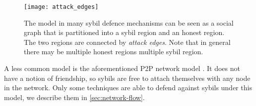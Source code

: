 \begin{figure}
  \centering
  \texttt{[image: attack\_edges]}
  \caption{The model in many sybil defence mechanisms can be seen as a social
    graph that is partitioned into a sybil region and an honest region. The two
    regions are connected by \emph{attack edges}. Note that in general there may
    be multiple honest regions multiple sybil region. }
  \label{fig:attack-edge}
\end{figure}

A less common model is the aforementioned P2P network model \cite{douceur2002sybil}.
It does not have a notion of friendship, so sybils are free to attach themselves
with any node in the network. Only some techniques are able to defend against
sybils under this model, we describe them in \autoref{sec:network-flow}.

